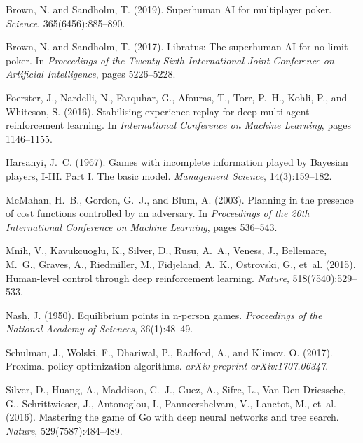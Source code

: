 \documentclass[11pt,a4paper]{article}
\begin{document}

\begin{thebibliography}{99}

Brown, N. and Sandholm, T. (2019).
\newblock Superhuman AI for multiplayer poker.
\newblock \emph{Science}, 365(6456):885--890.

Brown, N. and Sandholm, T. (2017).
\newblock Libratus: The superhuman AI for no-limit poker.
\newblock In \emph{Proceedings of the Twenty-Sixth International Joint Conference on Artificial Intelligence}, pages 5226--5228.

Foerster, J., Nardelli, N., Farquhar, G., Afouras, T., Torr, P.~H., Kohli, P., and Whiteson, S. (2016).
\newblock Stabilising experience replay for deep multi-agent reinforcement learning.
\newblock In \emph{International Conference on Machine Learning}, pages 1146--1155.

Harsanyi, J.~C. (1967).
\newblock Games with incomplete information played by Bayesian players, I-III. Part I. The basic model.
\newblock \emph{Management Science}, 14(3):159--182.

McMahan, H.~B., Gordon, G.~J., and Blum, A. (2003).
\newblock Planning in the presence of cost functions controlled by an adversary.
\newblock In \emph{Proceedings of the 20th International Conference on Machine Learning}, pages 536--543.

Mnih, V., Kavukcuoglu, K., Silver, D., Rusu, A.~A., Veness, J., Bellemare, M.~G., Graves, A., Riedmiller, M., Fidjeland, A.~K., Ostrovski, G., et~al. (2015).
\newblock Human-level control through deep reinforcement learning.
\newblock \emph{Nature}, 518(7540):529--533.

Nash, J. (1950).
\newblock Equilibrium points in n-person games.
\newblock \emph{Proceedings of the National Academy of Sciences}, 36(1):48--49.

Schulman, J., Wolski, F., Dhariwal, P., Radford, A., and Klimov, O. (2017).
\newblock Proximal policy optimization algorithms.
\newblock \emph{arXiv preprint arXiv:1707.06347}.

Silver, D., Huang, A., Maddison, C.~J., Guez, A., Sifre, L., Van Den Driessche, G., Schrittwieser, J., Antonoglou, I., Panneershelvam, V., Lanctot, M., et~al. (2016).
\newblock Mastering the game of Go with deep neural networks and tree search.
\newblock \emph{Nature}, 529(7587):484--489.


\end{thebibliography}
\end{document}
